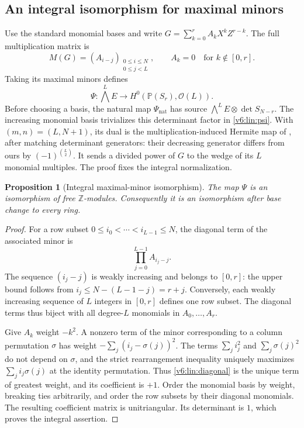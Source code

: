 \documentclass[10pt,fleqn]{article}
\numberwithin{equation}{section}
\newtheorem{proposition}[theorem]{Proposition}
\newcommand{\PP}{\mathbb P}
\begin{document}
\subsection{An integral isomorphism for maximal minors}

Use the standard monomial bases and write
$G=\sum_{k=0}^r A_kX^kZ^{r-k}$.  The full multiplication matrix is
\[
 M(G)=(A_{i-j})_{\substack{0\le i\le N\\0\le j<L}},
 \qquad A_k=0\quad\text{for }k\notin[0,r].
\]
Taking its maximal minors defines
\begin{equation}\label{v6:lin:psi}
 \Psi:\bigwedge^L E\longrightarrow
 H^0(\PP(S_r),\mathcal O(L)).
\end{equation}
Before choosing a basis, the natural map $\Psi_{\mathrm{nat}}$ has source
$\bigwedge^L E\otimes\det S_{N-r}$.  The increasing monomial basis
trivializes this determinant factor in \eqref{v6:lin:psi}.
With $(m,n)=(L,N+1)$, its dual is the multiplication-induced Hermite map of
\cite[Section~2.4, Theorem~2.9, arXiv version]{RaicuSam}, after matching
determinant generators: their decreasing generator differs from ours
by $(-1)^{\binom L2}$.  It sends a divided power of $G$ to the wedge of its $L$ monomial
multiples.  The proof fixes the integral normalization.

\begin{proposition}[Integral maximal-minor isomorphism]
\label{v6:lin:minor-isomorphism}
The map $\Psi$ is an isomorphism of free $\mathbb Z$-modules.
Consequently it is an isomorphism after base change to every ring.
\end{proposition}

\begin{proof}
For a row subset $0\le i_0<\cdots<i_{L-1}\le N$, the diagonal
term of the associated minor is
\begin{equation}\label{v6:lin:diagonal}
 \prod_{j=0}^{L-1}A_{i_j-j}.
\end{equation}
The sequence $(i_j-j)$ is weakly increasing and belongs to $[0,r]$:
the upper bound follows from
$i_j\le N-(L-1-j)=r+j$.
Conversely, each weakly increasing sequence of $L$ integers in $[0,r]$
defines one row subset.  The diagonal terms thus biject with all
degree-$L$ monomials in $A_0,\ldots,A_r$.

Give $A_k$ weight $-k^2$.  A nonzero term of the minor corresponding
to a column permutation $\sigma$ has weight
$-\sum_j(i_j-\sigma(j))^2$.  The terms
$\sum_j i_j^2$ and $\sum_j\sigma(j)^2$ do not depend on $\sigma$,
and the strict rearrangement inequality uniquely maximizes
$\sum_j i_j\sigma(j)$ at the identity permutation.  Thus
\eqref{v6:lin:diagonal} is the unique term of greatest weight, and its
coefficient is $+1$.  Order the monomial basis by weight, breaking
ties arbitrarily, and order the row subsets by their diagonal
monomials.  The resulting coefficient matrix is unitriangular.
Its determinant is $1$, which proves the integral assertion.
\end{proof}
\end{document}
